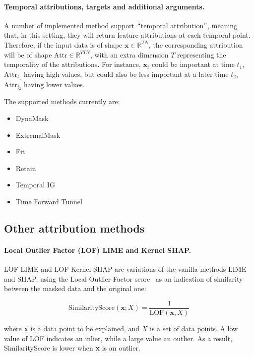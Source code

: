 \paragraph{Temporal attributions, targets and additional arguments.}

A number of implemented method support $``$temporal attribution$"$, meaning that, in this setting, they will return
feature attributions at each temporal point.
Therefore, if the input data is of shape $\textbf{x} \in \mathbb{R}^{TN}$, the corresponding attribution will be of
shape $\textrm{Attr} \in \mathbb{R}^{TTN}$, with an extra dimension $T$ representing the temporality of the attributions.
For instance, $\textbf{x}_t$ could be important at time $t_1$, $\textrm{Attr}_{t_1}$ having high values, but could also
be less important at a later time $t_2$, $\textrm{Attr}_{t_2}$ having lower values.

The supported methods currently are:

\begin{itemize}
    \item DynaMask
    \item ExtremalMask
    \item Fit
    \item Retain
    \item Temporal IG
    \item Time Forward Tunnel
\end{itemize}


\subsection{Other attribution methods}
\label{subsec:other-attribution-methods}

\paragraph{Local Outlier Factor (LOF) LIME and Kernel SHAP\@.}

LOF LIME and LOF Kernel SHAP are variations of the vanilla methods LIME and SHAP, using the Local Outlier Factor
score~\citep{breunig2000lof} as an indication of similarity between the masked data and the original one:

\[ \textrm{SimilarityScore}(\textbf{x}; X) = \frac{1}{\textrm{LOF}(\textbf{x}, X)} \]

where \textbf{x} is a data point to be explained, and $X$ is a set of data points.
A low value of LOF indicates an inlier, while a large value an outlier.
As a result, SimilarityScore is lower when \textbf{x} is an outlier.

